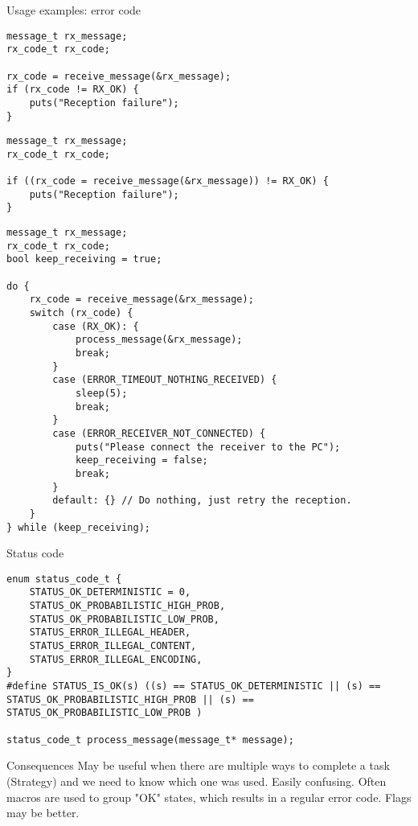 \documentclass[aspectratio=169,14pt]{beamer}
\begin{document}
\begin{frame}[fragile]{Usage examples: error code}
\begin{lstlisting}[style=cstyle]
message_t rx_message;
rx_code_t rx_code;

rx_code = receive_message(&rx_message);
if (rx_code != RX_OK) {
    puts("Reception failure");
}
\end{lstlisting}

\begin{lstlisting}[style=cstyle]
message_t rx_message;
rx_code_t rx_code;

if ((rx_code = receive_message(&rx_message)) != RX_OK) {
    puts("Reception failure");
}
\end{lstlisting}
\end{frame}

\begin{frame}[fragile]{}
\begin{lstlisting}[style=cstyle,basicstyle=\scriptsize\ttfamily]
message_t rx_message;
rx_code_t rx_code;
bool keep_receiving = true;

do {
    rx_code = receive_message(&rx_message);
    switch (rx_code) {
        case (RX_OK): {
            process_message(&rx_message);
            break;
        }
        case (ERROR_TIMEOUT_NOTHING_RECEIVED) {
            sleep(5);
            break;
        }
        case (ERROR_RECEIVER_NOT_CONNECTED) {
            puts("Please connect the receiver to the PC");
            keep_receiving = false;
            break;
        }
        default: {} // Do nothing, just retry the reception.
    }
} while (keep_receiving);
\end{lstlisting}
\end{frame}


\begin{frame}[fragile]{Status code}
\begin{lstlisting}[style=cstyle]
enum status_code_t {
    STATUS_OK_DETERMINISTIC = 0,
    STATUS_OK_PROBABILISTIC_HIGH_PROB,
    STATUS_OK_PROBABILISTIC_LOW_PROB,
    STATUS_ERROR_ILLEGAL_HEADER,
    STATUS_ERROR_ILLEGAL_CONTENT,
    STATUS_ERROR_ILLEGAL_ENCODING,
}
#define STATUS_IS_OK(s) ((s) == STATUS_OK_DETERMINISTIC || (s) == STATUS_OK_PROBABILISTIC_HIGH_PROB || (s) == STATUS_OK_PROBABILISTIC_LOW_PROB )

status_code_t process_message(message_t* message);
\end{lstlisting}

\begin{block}{Consequences}
    May be useful when there are multiple ways to complete a task (Strategy) and we need to know which one was used. Easily confusing. Often macros are used to group "OK" states, which results in a regular error code. Flags may be better.
\end{block}
\end{frame}
\end{document}
